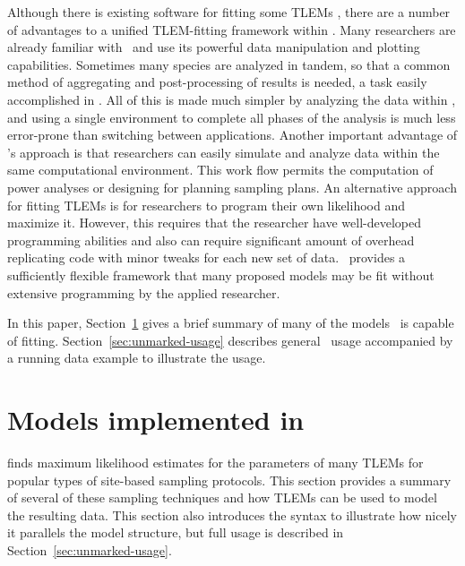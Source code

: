 \documentclass[article,shortnames]{jss}
\newcommand{\um}{\pkg{unmarked}}
\newcommand{\rlang}{\proglang{R}}
\begin{document}
Although there is existing software for fitting some TLEMs
\citep[e.g.,][for occupancy models]{Hines2002}, there are a number of
advantages to a unified TLEM-fitting framework within \rlang.  Many
researchers are already familiar with \rlang\ and use its powerful
data manipulation and plotting capabilities.  
Sometimes many
species are analyzed in tandem, so that a common method of aggregating
and post-processing of results is needed, a task easily accomplished
in \rlang.  All of this is made much simpler by analyzing the data
within \rlang, and using a single environment to complete all phases of 
the analysis is much less error-prone than switching between applications.
Another important advantage of \um's approach is
that researchers can easily simulate and analyze data within the same
computational environment.  This work flow permits the computation of
power analyses or designing for planning sampling plans.  An
alternative approach for fitting TLEMs is for researchers to program
their own likelihood and maximize it.  However, this requires that the
researcher have well-developed programming abilities and also can
require significant amount of overhead replicating code with minor
tweaks for each new set of data.  \um\ provides a sufficiently
flexible framework that many proposed models may be fit without
extensive programming by the applied researcher.

In this paper, Section~\ref{sec:models-impl-unmark} %
gives a brief %
summary of many of the models \um\ is capable of fitting.  %
Section~\ref{sec:unmarked-usage} %
describes general \um\ usage %
accompanied by a running data example to illustrate the usage.

\section[Models implemented in unmarked]{Models implemented in \um}
\label{sec:models-impl-unmark}

 finds maximum likelihood estimates for the parameters
of many TLEMs for %
popular types of site-based sampling protocols.
This section provides a summary of several of these sampling
techniques and how TLEMs can be used to model the resulting data.
This section also introduces the syntax to illustrate how nicely it
parallels the model structure, but full usage %
is described in
Section~\ref{sec:unmarked-usage}.
\end{document}
